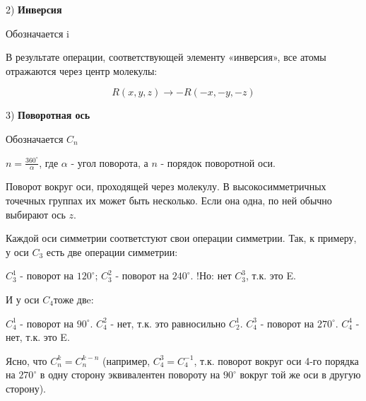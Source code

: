 2) \textbf{Инверсия} 

\par\smallskip

Обозначается i

\par\smallskip

В результате операции, соответствующей элементу «инверсия»,
все атомы отражаются через центр молекулы:

$$R(x,y,z) \longrightarrow -R(-x,-y,-z)$$

3) \textbf{Поворотная ось}

\par\smallskip

Обозначается $C_n$

\par\smallskip

$n=\frac{360^\circ}{\alpha}$, где $\alpha$ - угол поворота, а $n$ - порядок поворотной оси.

\par\smallskip

Поворот вокруг оси, проходящей через молекулу. В
высокосимметричных точечных группах их может быть несколько.
Если она одна, по ней обычно выбирают ось $z$.

\par\smallskip

Каждой оси симметрии соответстуют свои операции симметрии.
Так, к примеру, у оси $C_3$ есть две операции симметрии:

\par\smallskip

$C_3^1$ - поворот на $120^\circ$; $C_3^2$ - поворот на $240^\circ$. !Но: нет   $C_3^3$, т.к. это E.

\par\smallskip

И у оси $C_4$тоже двe:

\par\smallskip

$C_4^1$ - поворот на $90^\circ$.  $C_4^2$ - нет, т.к. это равносильно $C_2^1$. $C_4^3$ - поворот на $270^\circ$. $C_4^4$ - нет, т.к. это E.

\par\smallskip

Ясно, что $C_n^k = C_n^{k-n}$ (например, $C_4^3 = C_4^{-1}$, т.к. поворот вокруг оси 4-го порядка на $270^\circ$ в одну сторону эквивалентен повороту на $90^\circ$ вокруг той же оси в другую сторону).

\par\smallskip
	
